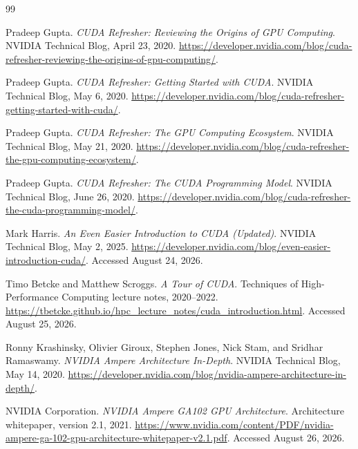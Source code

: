 \documentclass[11pt]{article}
\numberwithin{equation}{section}
\numberwithin{figure}{section}
\numberwithin{table}{section}
\begin{document}
\begingroup
\small
\raggedright
\begin{thebibliography}{99}

Pradeep Gupta.
\newblock \emph{CUDA Refresher: Reviewing the Origins of GPU Computing}.
\newblock NVIDIA Technical Blog, April 23, 2020.
\newblock \url{https://developer.nvidia.com/blog/cuda-refresher-reviewing-the-origins-of-gpu-computing/}.

Pradeep Gupta.
\newblock \emph{CUDA Refresher: Getting Started with CUDA}.
\newblock NVIDIA Technical Blog, May 6, 2020.
\newblock \url{https://developer.nvidia.com/blog/cuda-refresher-getting-started-with-cuda/}.

Pradeep Gupta.
\newblock \emph{CUDA Refresher: The GPU Computing Ecosystem}.
\newblock NVIDIA Technical Blog, May 21, 2020.
\newblock \url{https://developer.nvidia.com/blog/cuda-refresher-the-gpu-computing-ecosystem/}.

Pradeep Gupta.
\newblock \emph{CUDA Refresher: The CUDA Programming Model}.
\newblock NVIDIA Technical Blog, June 26, 2020.
\newblock \url{https://developer.nvidia.com/blog/cuda-refresher-the-cuda-programming-model/}.

Mark Harris.
\newblock \emph{An Even Easier Introduction to CUDA (Updated)}.
\newblock NVIDIA Technical Blog, May 2, 2025.
\newblock \url{https://developer.nvidia.com/blog/even-easier-introduction-cuda/}.
\newblock Accessed August 24, 2026.

Timo Betcke and Matthew Scroggs.
\newblock \emph{A Tour of CUDA}.
\newblock Techniques of High-Performance Computing lecture notes, 2020--2022.
\newblock \url{https://tbetcke.github.io/hpc_lecture_notes/cuda_introduction.html}.
\newblock Accessed August 25, 2026.

Ronny Krashinsky, Olivier Giroux, Stephen Jones, Nick Stam, and Sridhar Ramaswamy.
\newblock \emph{NVIDIA Ampere Architecture In-Depth}.
\newblock NVIDIA Technical Blog, May 14, 2020.
\newblock \url{https://developer.nvidia.com/blog/nvidia-ampere-architecture-in-depth/}.

NVIDIA Corporation.
\newblock \emph{NVIDIA Ampere GA102 GPU Architecture}.
\newblock Architecture whitepaper, version 2.1, 2021.
\newblock \url{https://www.nvidia.com/content/PDF/nvidia-ampere-ga-102-gpu-architecture-whitepaper-v2.1.pdf}.
\newblock Accessed August 26, 2026.


\end{thebibliography}
\end{document}
